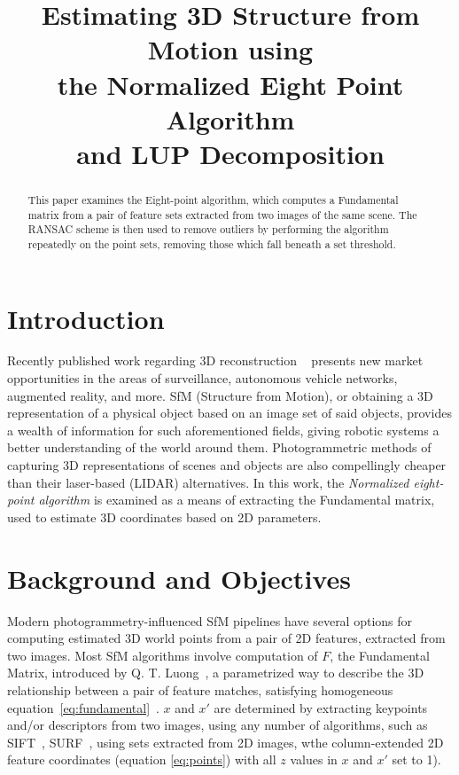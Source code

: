 \documentclass[Conference]{IEEEtran}
\title{Estimating 3D Structure from Motion using\\
the Normalized Eight Point Algorithm\\
and LUP Decomposition\\}
\begin{document}
\author{
}

\maketitle

\begin{abstract}
This paper examines the Eight-point algorithm, which computes a Fundamental matrix from a pair of feature sets extracted from two images of the same scene. The RANSAC scheme is then used to remove outliers by performing the algorithm repeatedly on the point sets, removing those which fall beneath a set threshold.
\end{abstract}

\section{Introduction}
Recently published work regarding 3D reconstruction ~\cite{Hartley2004} presents new market opportunities in the areas of surveillance, autonomous vehicle networks, augmented reality, and more. SfM (Structure from Motion), or obtaining a 3D representation of a physical object based on an image set of said objects, provides a wealth of information for such aforementioned fields, giving robotic systems a better understanding of the world around them. Photogrammetric methods of capturing 3D representations of scenes and objects are also compellingly cheaper than their laser-based (LIDAR) alternatives.
In this work, the \textit{Normalized eight-point algorithm} is examined as a means of extracting the Fundamental matrix, used to estimate 3D coordinates based on 2D parameters.

\section{Background and Objectives}
Modern photogrammetry-influenced SfM pipelines have several options for computing estimated 3D world points from a pair of 2D features, extracted from two images. Most SfM algorithms involve computation of $F$, the Fundamental Matrix, introduced by Q. T. Luong~\cite{AICPub329:1992}, a parametrized way to describe the 3D relationship between a pair of feature matches, satisfying homogeneous equation~\eqref{eq:fundamental}~\cite{Hartley2004}. $x$ and $x'$ are determined by extracting keypoints and/or descriptors from two images, using any number of algorithms, such as SIFT~\cite{Bay:2008:SRF:1370312.1370556}, SURF~\cite{Bay:2008:SRF:1370312.1370556},  using sets extracted from 2D images, wthe column-extended 2D feature coordinates (equation \eqref{eq:points}) with all $z$ values in $x$ and $x'$ set to 1).
\end{document}
